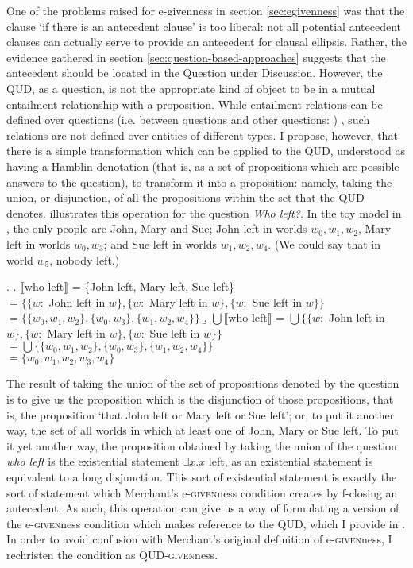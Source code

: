 \documentclass[doublespace]{umthesis}
\newcommand{\ext}[1]{\ensuremath{\llbracket \textrm{{#1}} \rrbracket}}
\begin{document}
One of the problems raised for e-givenness in section \ref{sec:egivenness} was that the clause `if there is an antecedent clause' is too liberal: not all potential antecedent clauses can actually serve to provide an antecedent for clausal ellipsis. Rather, the evidence gathered in section \ref{sec:question-based-approaches} suggests that the antecedent should be located in the Question under Discussion. However, the QUD, as a question, is not the appropriate kind of object to be in a mutual entailment relationship with a proposition. While entailment relations can be defined over questions (i.e. between questions and other questions: \cite{RoQUD}) %
, such relations are not defined over entities of different types. I propose, however, that there is a simple transformation which can be applied to the QUD, understood as having a Hamblin denotation (that is, as a set of propositions which are possible answers to the question), to transform it into a proposition: namely, taking the union, or disjunction, of all the propositions within the set that the QUD denotes. \Next illustrates this operation for the question {\it Who left?}. In the toy model in \Next, the only people are John, Mary and Sue; John left in worlds $w_0, w_1, w_2$, Mary left in worlds $w_0, w_3$; and Sue left in worlds $w_1, w_2, w_4$. (We could say that in world $w_5$, nobody left.)

\ex. 	\a. \ext{who left} = \{John left, Mary left, Sue left\}\\
	$= \{ \{ w: $ John left in $ w\}, \{ w: $ Mary left in $w \}, \{ w: $ Sue left in $w \} \}$\\
	$= \{ \{w_0, w_1, w_2\}, \{w_0, w_3\}, \{w_1, w_2, w_4\} \}$
	\b. $\bigcup$\ext{who left} = $\bigcup\{ \{ w: $ John left in $ w\}, \{ w: $ Mary left in $w \}, \{ w: $ Sue left in $w \} \}$\\
	$=\bigcup\{ \{w_0, w_1, w_2\}, \{w_0, w_3\}, \{w_1, w_2, w_4\} \}$\\
	$=\{w_0, w_1, w_2, w_3, w_4\}$
	
The result of taking the union of the set of propositions denoted by the question is to give us the proposition which is the disjunction of those propositions, that is, the proposition `that John left or Mary left or Sue left'; or, to put it another way, the set of all worlds in which at least one of John, Mary or Sue left. To put it yet another way, the proposition obtained by taking the union of the question {\it who left} is the existential statement $\exists x. x$ left, as an existential statement is equivalent to a long disjunction. This sort of existential statement is exactly the sort of statement which Merchant's e-\textsc{given}ness condition creates by f-closing an antecedent. As such, this operation can give us a way of formulating a version of the e-\textsc{given}ness condition which makes reference to the QUD, which I provide in \Next. In order to avoid confusion with Merchant's original definition of e-\textsc{given}ness, I rechristen the condition as QUD-\textsc{given}ness.
\end{document}
